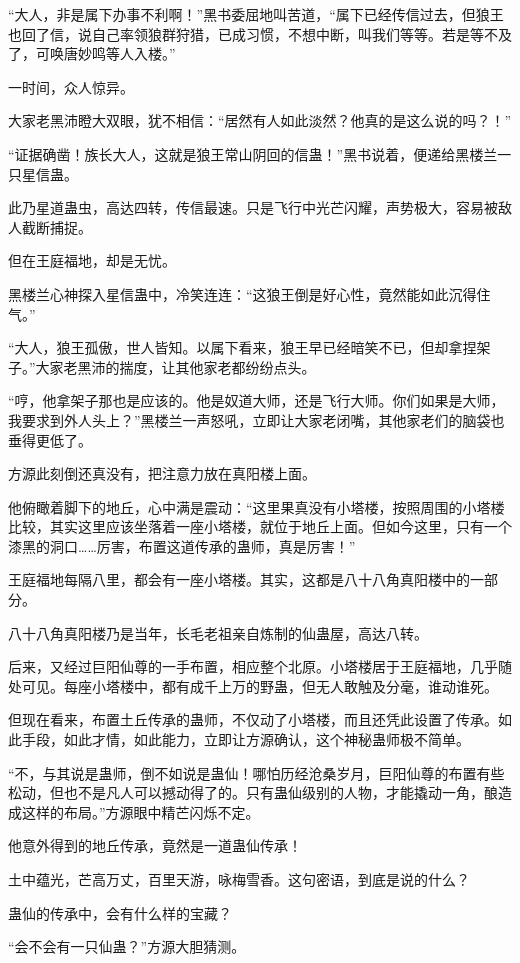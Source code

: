 \begin{this_body}
“大人，非是属下办事不利啊！”黑书委屈地叫苦道，“属下已经传信过去，但狼王也回了信，说自己率领狼群狩猎，已成习惯，不想中断，叫我们等等。若是等不及了，可唤唐妙鸣等人入楼。”

一时间，众人惊异。

大家老黑沛瞪大双眼，犹不相信：“居然有人如此淡然？他真的是这么说的吗？！”

“证据确凿！族长大人，这就是狼王常山阴回的信蛊！”黑书说着，便递给黑楼兰一只星信蛊。

此乃星道蛊虫，高达四转，传信最速。只是飞行中光芒闪耀，声势极大，容易被敌人截断捕捉。

但在王庭福地，却是无忧。

黑楼兰心神探入星信蛊中，冷笑连连：“这狼王倒是好心性，竟然能如此沉得住气。”

“大人，狼王孤傲，世人皆知。以属下看来，狼王早已经暗笑不已，但却拿捏架子。”大家老黑沛的揣度，让其他家老都纷纷点头。

“哼，他拿架子那也是应该的。他是奴道大师，还是飞行大师。你们如果是大师，我要求到外人头上？”黑楼兰一声怒吼，立即让大家老闭嘴，其他家老们的脑袋也垂得更低了。

方源此刻倒还真没有，把注意力放在真阳楼上面。

他俯瞰着脚下的地丘，心中满是震动：“这里果真没有小塔楼，按照周围的小塔楼比较，其实这里应该坐落着一座小塔楼，就位于地丘上面。但如今这里，只有一个漆黑的洞口……厉害，布置这道传承的蛊师，真是厉害！”

王庭福地每隔八里，都会有一座小塔楼。其实，这都是八十八角真阳楼中的一部分。

八十八角真阳楼乃是当年，长毛老祖亲自炼制的仙蛊屋，高达八转。

后来，又经过巨阳仙尊的一手布置，相应整个北原。小塔楼居于王庭福地，几乎随处可见。每座小塔楼中，都有成千上万的野蛊，但无人敢触及分毫，谁动谁死。

但现在看来，布置土丘传承的蛊师，不仅动了小塔楼，而且还凭此设置了传承。如此手段，如此才情，如此能力，立即让方源确认，这个神秘蛊师极不简单。

“不，与其说是蛊师，倒不如说是蛊仙！哪怕历经沧桑岁月，巨阳仙尊的布置有些松动，但也不是凡人可以撼动得了的。只有蛊仙级别的人物，才能撬动一角，酿造成这样的布局。”方源眼中精芒闪烁不定。

他意外得到的地丘传承，竟然是一道蛊仙传承！

土中蕴光，芒高万丈，百里天游，咏梅雪香。这句密语，到底是说的什么？

蛊仙的传承中，会有什么样的宝藏？

“会不会有一只仙蛊？”方源大胆猜测。


\end{this_body}
